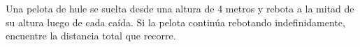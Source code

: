 \item Una pelota de hule se suelta desde una altura de 4 metros y rebota a la mitad de su altura luego de cada caída. Si la pelota continúa rebotando indefinidamente, encuentre la distancia total que recorre.
